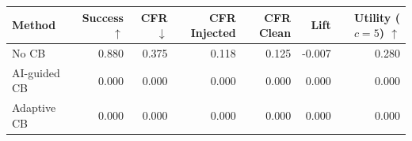 \begin{tabular}{lrrrrrr}
\toprule
Method & Success $\uparrow$ & CFR $\downarrow$ & CFR Injected & CFR Clean & Lift & Utility ($c=5$) $\uparrow$ \\
\midrule
No CB & 0.880 & 0.375 & 0.118 & 0.125 & -0.007 & 0.280 \\
AI-guided CB & 0.000 & 0.000 & 0.000 & 0.000 & 0.000 & 0.000 \\
Adaptive CB & 0.000 & 0.000 & 0.000 & 0.000 & 0.000 & 0.000 \\
\bottomrule
\end{tabular}
